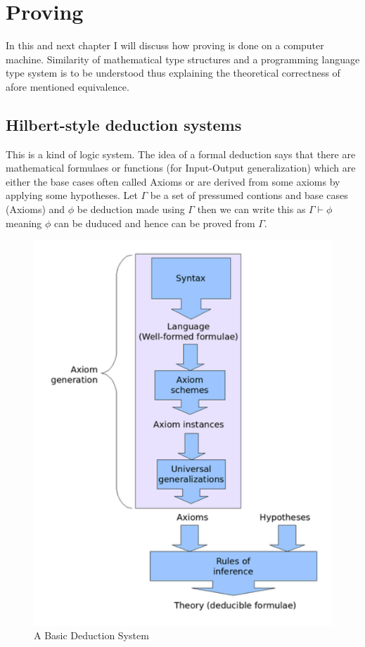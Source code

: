 \chapter{Proving}
\graphicspath{ {./images/} }

In this and next chapter I will discuss how proving is done on a computer machine. Similarity of mathematical type structures and a programming language type system is to be understood thus explaining the theoretical correctness of afore mentioned equivalence.

\section{Hilbert-style deduction systems}
This is a kind of logic system. The idea of a formal deduction says that there are mathematical formulaes or functions (for Input-Output generalization) which are either the base cases often called Axioms or are derived from some axioms by applying some hypotheses. Let $\Gamma$ be a set of pressumed contions and base cases (Axioms) and $\phi$ be deduction made using $\Gamma$ then we can write this as $\Gamma\vdash\phi$ meaning $\phi$ can be duduced and hence can be proved from $\Gamma$. 


\begin{figure}[!htb]
\centering
  \includegraphics[scale=0.4]{hilbert}
  \caption{A Basic Deduction System}
\end{figure}

